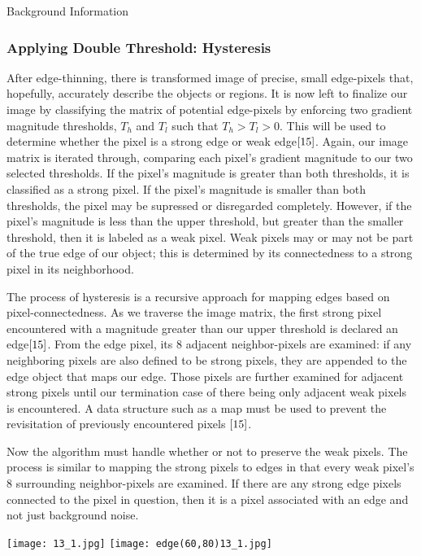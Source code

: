 \documentclass[a4paper,12pt]{article}
\begin{document}
\begin{section}{Background Information}
\subsubsection{Applying Double Threshold: Hysteresis}

After edge-thinning, there is transformed image of precise, small edge-pixels that, hopefully, accurately describe the objects or regions.
It is now left to finalize our image by classifying the matrix of potential edge-pixels by enforcing two gradient magnitude thresholds, $T_h$ and $T_l$ such that $T_h$$>$$T_l$$>$$0$. This will be used to determine whether the pixel is a strong edge or weak edge$\cite{15}$.%
Again, our image matrix is iterated through, comparing each pixel's gradient magnitude to our two selected thresholds.
If the pixel's magnitude is greater than both thresholds, it is classified as a strong pixel.
If the pixel's magnitude is smaller than both thresholds, the pixel may be supressed or disregarded completely.
However, if the pixel's magnitude is less than the upper threshold, but greater than the smaller threshold, then it is labeled as a weak pixel.
Weak pixels may or may not be part of the true edge of our object; this is determined by its connectedness to a strong pixel in its neighborhood.

The process of hysteresis is a recursive approach for mapping edges based on pixel-connectedness. As we traverse the image matrix, the first strong pixel encountered with a magnitude greater than our upper threshold is declared an edge$\cite{15}$.%
From the edge pixel, its 8 adjacent neighbor-pixels are examined: if any neighboring pixels are also defined to be strong pixels, they are appended to the edge object that maps our edge.
Those pixels are further examined for adjacent strong pixels until our termination case of there being only adjacent weak pixels is encountered.
A data structure such as a map must be used to prevent the revisitation of previously encountered pixels $\cite{15}$.

Now the algorithm must handle whether or not to preserve the weak pixels.
The process is similar to mapping the strong pixels to edges in that every weak pixel's 8 surrounding neighbor-pixels are examined. 
If there are any strong edge pixels connected to the pixel in question, then it is a pixel associated with an edge and not just background noise.\\

\begin{center}
\texttt{[image: 13\_1.jpg]}
\texttt{[image: edge(60,80)13\_1.jpg]}


\end{center}
\end{section}
\end{document}
